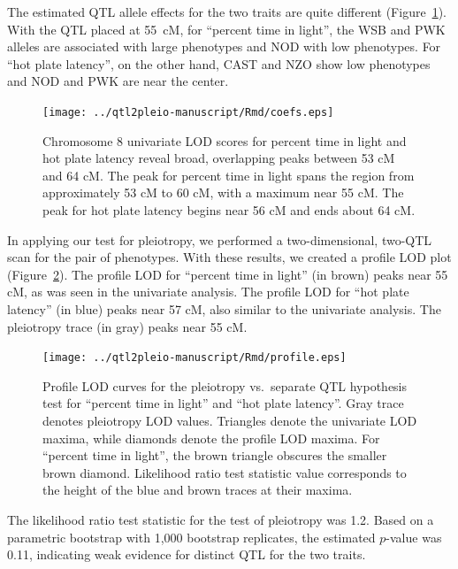 \documentclass[oneside]{book}\usepackage[]{graphicx}\usepackage[]{color}
\begin{document}
The estimated QTL allele effects for the two traits are quite
different (Figure~\ref{fig:chr8-effects}).
With the QTL placed at 55~cM, for ``percent time in light'', the WSB and PWK alleles are associated
with large phenotypes and NOD with low phenotypes.
For ``hot plate latency'', on the other hand,
CAST and NZO show low phenotypes and NOD and PWK are near the center.

\begin{figure}
\texttt{[image: ../qtl2pleio-manuscript/Rmd/coefs.eps]}
\caption{Chromosome 8 univariate LOD scores for percent time in light
  and hot plate latency reveal broad, overlapping peaks between 53 cM
  and 64 cM. The peak for percent time in light spans the region from
  approximately 53 cM to 60 cM, with a maximum near 55 cM. The peak
  for hot plate latency begins near 56 cM and ends about 64 cM.}
\label{fig:chr8-effects}
\end{figure}

In applying our test for pleiotropy,  we performed a two-dimensional, two-QTL scan for the pair of
phenotypes. With these results, we created a profile LOD plot
(Figure~\ref{fig:profiles}). The profile LOD for ``percent
time in light'' (in brown) peaks near 55 cM, as was seen in the univariate
analysis.  The profile LOD for ``hot plate latency'' (in blue) peaks near 57 cM,
also similar to the univariate analysis.
The pleiotropy trace (in gray) peaks near 55 cM.

\begin{figure}
\texttt{[image: ../qtl2pleio-manuscript/Rmd/profile.eps]}
\caption{Profile LOD curves for the pleiotropy vs.\ separate QTL
  hypothesis test for ``percent time in light'' and ``hot plate latency''.
  Gray trace denotes pleiotropy LOD values. Triangles denote the
  univariate LOD maxima, while diamonds denote the profile LOD maxima.
  For ``percent time in light'', the brown triangle obscures the
  smaller brown diamond. Likelihood ratio test statistic value
  corresponds to the height of the blue and brown traces at their
  maxima.}
\label{fig:profiles}
\end{figure}

The likelihood ratio test statistic for the test of pleiotropy was
1.2. Based on a parametric bootstrap with 1,000 bootstrap replicates,
the estimated $p$-value was 0.11, indicating weak
evidence for distinct QTL for the two traits.
\end{document}
